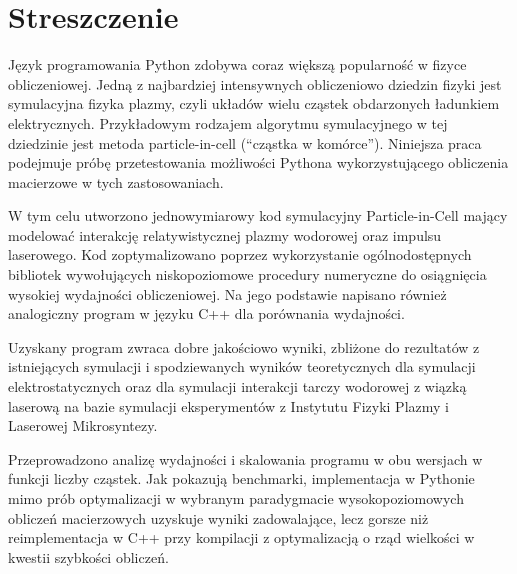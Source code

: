 \section{Streszczenie}

Język programowania Python zdobywa coraz większą popularność w fizyce obliczeniowej.
Jedną z najbardziej intensywnych obliczeniowo dziedzin fizyki jest symulacyjna fizyka
plazmy, czyli układów wielu cząstek obdarzonych ładunkiem elektrycznych.
Przykładowym rodzajem algorytmu symulacyjnego w tej dziedzinie jest metoda particle-in-cell
(``cząstka w komórce'').
Niniejsza praca podejmuje próbę przetestowania możliwości Pythona wykorzystującego 
obliczenia macierzowe w tych zastosowaniach.

W tym celu
utworzono jednowymiarowy kod symulacyjny Particle-in-Cell mający modelować interakcję relatywistycznej plazmy wodorowej oraz
impulsu laserowego. Kod zoptymalizowano poprzez wykorzystanie ogólnodostępnych bibliotek 
wywołujących niskopoziomowe procedury numeryczne do osiągnięcia wysokiej wydajności obliczeniowej. Na jego podstawie
napisano również analogiczny program w języku C++ dla porównania wydajności.

Uzyskany program zwraca dobre jakościowo wyniki, zbliżone do rezultatów z istniejących symulacji i spodziewanych
wyników teoretycznych dla symulacji elektrostatycznych oraz dla symulacji interakcji tarczy wodorowej z wiązką laserową
na bazie symulacji eksperymentów z Instytutu Fizyki Plazmy i Laserowej Mikrosyntezy.

Przeprowadzono analizę wydajności i skalowania programu w obu wersjach w funkcji liczby cząstek.  
Jak pokazują benchmarki, implementacja w Pythonie mimo prób optymalizacji w wybranym paradygmacie wysokopoziomowych obliczeń macierzowych
uzyskuje wyniki zadowalające, lecz gorsze niż reimplementacja w C++ przy
kompilacji z optymalizacją o rząd wielkości w kwestii szybkości obliczeń.
